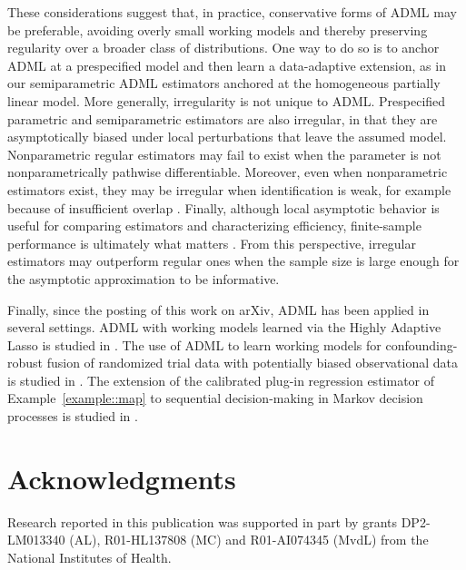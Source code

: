 \documentclass[11pt]{article}
\theoremstyle{definition}
\begin{document}
These considerations suggest that, in practice, conservative forms of ADML may be preferable, avoiding overly small working models and thereby preserving regularity over a broader class of distributions. One way to do so is to anchor ADML at a prespecified model and then learn a data-adaptive extension, as in our semiparametric ADML estimators anchored at the homogeneous partially linear model. More generally, irregularity is not unique to ADML. Prespecified parametric and semiparametric estimators are also irregular, in that they are asymptotically biased under local perturbations that leave the assumed model. Nonparametric regular estimators may fail to exist when the parameter is not nonparametrically pathwise differentiable. Moreover, even when nonparametric estimators exist, they may be irregular when identification is weak, for example because of insufficient overlap \citep{mehrabi2024off}. Finally, although local asymptotic behavior is useful for comparing estimators and characterizing efficiency, finite-sample performance is ultimately what matters \citep{chernozhukov2023simple}. From this perspective, irregular estimators may outperform regular ones when the sample size is large enough for the asymptotic approximation to be informative.


Finally, since the posting of this work on arXiv, ADML has been applied in several settings. ADML with working models learned via the Highly Adaptive Lasso is studied in \cite{li2025regularized}. The use of ADML to learn working models for confounding-robust fusion of randomized trial data with potentially biased observational data is studied in \cite{van2024adaptive}. The extension of the calibrated plug-in regression estimator of Example~\ref{example::map} to sequential decision-making in Markov decision processes is studied in \cite{van2025automatic}.

 
\vspace{0.3in}
\singlespacing

\section*{Acknowledgments}
Research reported in this publication was supported in part by grants DP2-LM013340 (AL), R01-HL137808 (MC) and R01-AI074345 (MvdL) from the National Institutes of Health.


 
 

\vspace{.3in}
 
\end{document}
